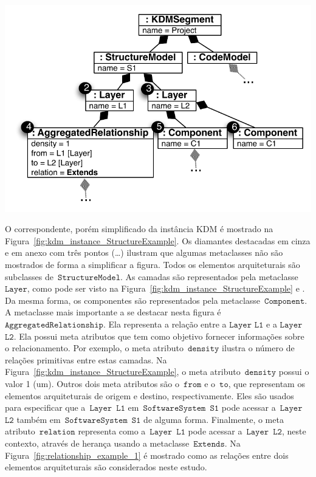 \begin{minipage}{.55\textwidth}
	\centering
	\includegraphics[scale=0.67]{images/StructureKDMINstance}
	\fautor
	\label{fig:kdm_instance_StructureExample}
\end{minipage}


O correspondente, porém simplificado da instância KDM é mostrado na Figura~\ref{fig:kdm_instance_StructureExample}. Os diamantes destacadas em cinza e em anexo com três pontos (\ldots) ilustram que algumas metaclasses não são mostrados de forma a simplificar a figura. Todos os elementos arquiteturais são subclasses de~$\mathtt{StructureModel}$. As camadas são representados pela metaclasse~$\mathtt{Layer}$, como pode ser visto na Figura~\ref{fig:kdm_instance_StructureExample}  e . Da mesma forma, os componentes são representados pela metaclasse~$\mathtt{Component}$. A metaclasse mais importante a se destacar nesta figura é $\mathtt{AggregatedRelationship}$. Ela representa a relação entre a $\mathtt{Layer}$ $\mathtt{L1}$ e a $\mathtt{Layer}$ $\mathtt{L2}$. Ela possui meta atributos que tem como objetivo fornecer informações sobre o relacionamento. Por exemplo, o meta atributo~$\mathtt{density}$ ilustra o número de relações primitivas entre estas camadas. Na Figura~\ref{fig:kdm_instance_StructureExample}, o meta atributo~$\mathtt{density}$ possui o valor 1 (um). Outros dois meta atributos são o~$\mathtt{from}$ e o~$\mathtt{to}$, que representam os elementos arquiteturais de origem e destino, respectivamente. Eles são usados para especificar que a~$\mathtt{Layer}$~$\mathtt{L1}$ em~$\mathtt{SoftwareSystem}$~$\mathtt{S1}$ pode acessar a~$\mathtt{Layer}$~$\mathtt{L2}$ também em~$\mathtt{SoftwareSystem}$~$\mathtt{S1}$ de alguma forma. Finalmente, o meta atributo~$\mathtt{relation}$ representa como a~$\mathtt{Layer}$~$\mathtt{L1}$ pode acessar a~$\mathtt{Layer}$~$\mathtt{L2}$, neste contexto, através de herança usando a metaclasse~$\mathtt{Extends}$. Na Figura~\ref{fig:relationship_example_1} é mostrado como as relações entre dois elementos arquiteturais são considerados neste estudo.

